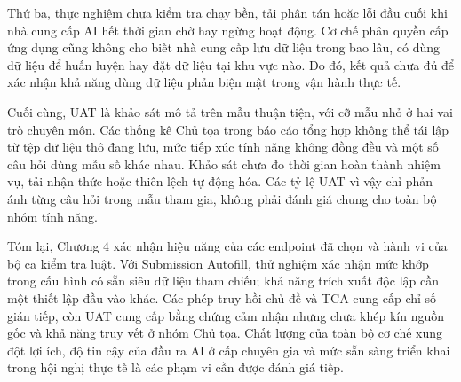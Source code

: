 Thứ ba, thực nghiệm chưa kiểm tra chạy bền, tải phân tán hoặc lỗi đầu cuối khi nhà cung cấp AI hết thời gian chờ hay ngừng hoạt động. Cơ chế phân quyền cấp ứng dụng cũng không cho biết nhà cung cấp lưu dữ liệu trong bao lâu, có dùng dữ liệu để huấn luyện hay đặt dữ liệu tại khu vực nào. Do đó, kết quả chưa đủ để xác nhận khả năng dùng dữ liệu phản biện mật trong vận hành thực tế.

Cuối cùng, UAT là khảo sát mô tả trên mẫu thuận tiện, với cỡ mẫu nhỏ ở hai vai trò chuyên môn. Các thống kê Chủ tọa trong báo cáo tổng hợp không thể tái lập từ tệp dữ liệu thô đang lưu, mức tiếp xúc tính năng không đồng đều và một số câu hỏi dùng mẫu số khác nhau. Khảo sát chưa đo thời gian hoàn thành nhiệm vụ, tải nhận thức hoặc thiên lệch tự động hóa. Các tỷ lệ UAT vì vậy chỉ phản ánh từng câu hỏi trong mẫu tham gia, không phải đánh giá chung cho toàn bộ nhóm tính năng.

Tóm lại, Chương 4 xác nhận hiệu năng của các endpoint đã chọn và hành vi của bộ ca kiểm tra luật. Với Submission Autofill, thử nghiệm xác nhận mức khớp trong cấu hình có sẵn siêu dữ liệu tham chiếu; khả năng trích xuất độc lập cần một thiết lập đầu vào khác. Các phép truy hồi chủ đề và TCA cung cấp chỉ số gián tiếp, còn UAT cung cấp bằng chứng cảm nhận nhưng chưa khép kín nguồn gốc và khả năng truy vết ở nhóm Chủ tọa. Chất lượng của toàn bộ cơ chế xung đột lợi ích, độ tin cậy của đầu ra AI ở cấp chuyên gia và mức sẵn sàng triển khai trong hội nghị thực tế là các phạm vi cần được đánh giá tiếp.
